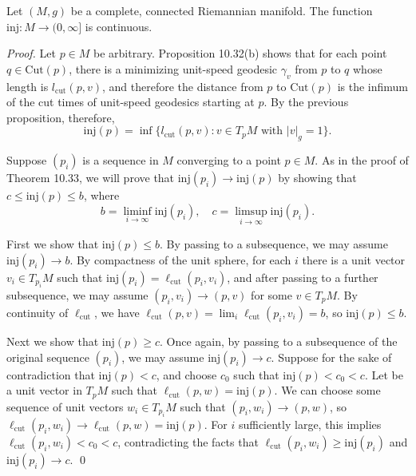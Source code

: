 \begin{proposition}
\label{prop:continuity-injectivity-radius}
Let $(M,g)$ be a complete, connected Riemannian manifold. The function $\text{inj}: M \to (0, \infty]$ is continuous.

\begin{proof}
Let $p \in M$ be arbitrary. Proposition 10.32(b) shows that for each point $q \in \text{Cut}(p)$, there is a minimizing unit-speed geodesic $\gamma_v$ from $p$ to $q$ whose length is $l_{\text{cut}}(p,v)$, and therefore the distance from $p$ to $\text{Cut}(p)$ is the infimum of the cut times of unit-speed geodesics starting at $p$. By the previous proposition, therefore,
\[
\text{inj}(p) = \inf\{l_{\text{cut}}(p,v) : v \in T_pM \text{ with } |v|_g = 1\}.
\]

Suppose $(p_i)$ is a sequence in $M$ converging to a point $p \in M$. As in the proof of Theorem 10.33, we will prove that $\text{inj}(p_i) \to \text{inj}(p)$ by showing that $c \leq \text{inj}(p) \leq b$, where
\[
b = \liminf_{i \to \infty} \text{inj}(p_i), \quad c = \limsup_{i \to \infty} \text{inj}(p_i).
\]

First we show that $\text{inj}(p) \le b$. By passing to a subsequence, we may assume $\text{inj}(p_i) \to b$. By compactness of the unit sphere, for each $i$ there is a unit vector $v_i \in T_{p_i} M$ such that $\text{inj}(p_i) = \ell_{\text{cut}}(p_i, v_i)$, and after passing to a further subsequence, we may assume $(p_i, v_i) \to (p, v)$ for some $v \in T_p M$. By continuity of $\ell_{\text{cut}}$, we have $\ell_{\text{cut}}(p, v) = \lim_i \ell_{\text{cut}}(p_i, v_i) = b$, so $\text{inj}(p) \le b$.

Next we show that $\text{inj}(p) \ge c$. Once again, by passing to a subsequence of the original sequence $(p_i)$, we may assume $\text{inj}(p_i) \to c$. Suppose for the sake of contradiction that $\text{inj}(p) < c$, and choose $c_0$ such that $\text{inj}(p) < c_0 < c$. Let be a unit vector in $T_p M$ such that $\ell_{\text{cut}}(p, w) = \text{inj}(p)$. We can choose some sequence of unit vectors $w_i \in T_{p_i} M$ such that $(p_i, w_i) \to (p, w)$, so $\ell_{\text{cut}}(p_i, w_i) \to \ell_{\text{cut}}(p, w) = \text{inj}(p)$. For $i$ sufficiently large, this implies $\ell_{\text{cut}}(p_i, w_i) < c_0 < c$, contradicting the facts that $\ell_{\text{cut}}(p_i, w_i) \ge \text{inj}(p_i)$ and $\text{inj}(p_i) \to c$. \qed
\end{proof}
\end{proposition}


